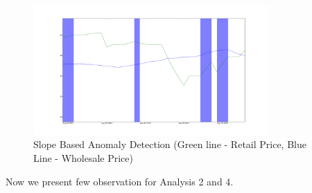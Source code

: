 \documentclass[a4paper,10pt]{report}
\begin{document}
\begin{itemize}
			\begin{figure}[H]
		    	\centering
  		    	\includegraphics[width=0.8\textwidth]{graphs/12134.png}
		    	\caption{Slope Based Anomaly Detection (Green line - Retail Price, Blue Line - Wholesale Price)}
		    	\label{fig:12134}
			\end{figure}			
			
		\end{itemize}
		
		
		Now we present few observation for Analysis 2 and 4.
		
\end{document}
